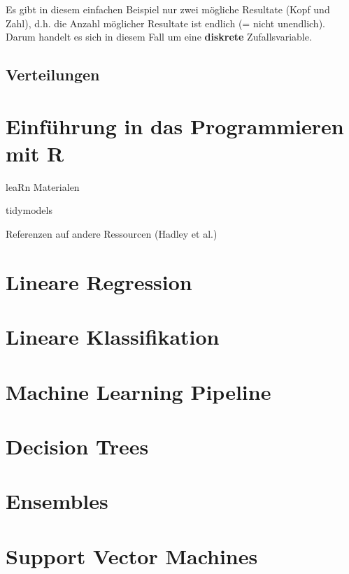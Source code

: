\documentclass[
]{book}
\begin{document}
Es gibt in diesem einfachen Beispiel nur zwei mögliche Resultate (Kopf und Zahl), d.h. die Anzahl möglicher Resultate ist endlich (= nicht unendlich). Darum handelt es sich in diesem Fall um eine \textbf{diskrete} Zufallsvariable.

\hypertarget{verteilungen}{%
\section{Verteilungen}\label{verteilungen}}

\hypertarget{intro-R}{%
\chapter{Einführung in das Programmieren mit R}\label{intro-R}}

leaRn Materialen

tidymodels

Referenzen auf andere Ressourcen (Hadley et al.)

\hypertarget{lin-reg}{%
\chapter{Lineare Regression}\label{lin-reg}}

\hypertarget{lin-class}{%
\chapter{Lineare Klassifikation}\label{lin-class}}

\hypertarget{ml-pipeline}{%
\chapter{Machine Learning Pipeline}\label{ml-pipeline}}

\hypertarget{trees}{%
\chapter{Decision Trees}\label{trees}}

\hypertarget{ensembles}{%
\chapter{Ensembles}\label{ensembles}}

\hypertarget{svm}{%
\chapter{Support Vector Machines}\label{svm}}
\end{document}
